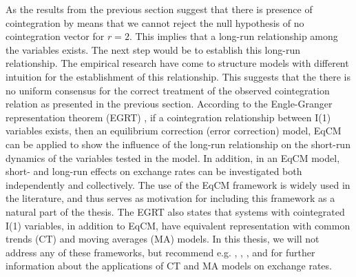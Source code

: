 \documentclass[10pt]{article}
\numberwithin{equation}{section}
\numberwithin{table}{section}
\numberwithin{figure}{section}
\begin{document}
\begin{spacing}{1.5}
\noindent As the results from the previous section suggest that there is presence of cointegration by means that we cannot reject the null hypothesis of no cointegration vector for $r=2$. This implies that a long-run relationship among the variables exists. The next step would be to establish this long-run relationship. The empirical research have come to structure models with different intuition for the establishment of this relationship. This suggests that the there is no uniform consensus for the correct treatment of the observed cointegration relation as presented in the previous section. According to the Engle-Granger representation theorem (EGRT) \citep{engle1987co}, if a cointegration relationship between I(1) variables exists, then an equilibrium correction (error correction) model, EqCM can be applied to show the influence of the long-run relationship on the short-run dynamics of the variables tested in the model. In addition, in an EqCM model, short- and long-run effects on exchange rates can be investigated both independently and collectively. The use of the EqCM framework is widely used in the literature, and thus serves as motivation for including this framework as a natural part of the thesis. The EGRT also states that systems with cointegrated I(1) variables, in addition to EqCM, have equivalent representation with common trends (CT) and moving averages (MA) models. In this thesis, we will not address any of these frameworks, but recommend e.g. \cite{baillie1989common}, \cite{crowder1994foreign}, \cite{enders1994theory}, \cite{sarno2002economics} and \cite{mizuno2006modeling} for further information about the applications of CT and MA models on exchange rates.\\

\end{spacing}
\end{document}
